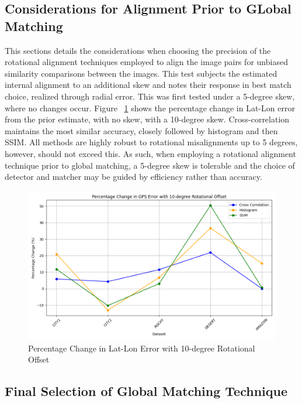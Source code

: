 \subsection{Considerations for Alignment Prior to GLobal Matching}

This sections details the considerations when choosing the precision of the rotational alignment techniques employed to align the image pairs for unbiased similarity comparisons  between the images. This test subjects the estimated internal alignment to an additional skew and notes their response in best match choice, realized through radial error. This was first tested under a 5-degree skew, where no changes occur. Figure ~\ref{fig:percentage_change_comparison_methods} shows the percentage change in Lat-Lon error from the prior estimate, with no skew, with a 10-degree skew. Cross-correlation maintains the most similar accuracy, closely followed by histogram and then SSIM. All methods are highly robust to rotational misalignments up to 5 degrees, however, should not exceed this. As such, when employing a rotational alignment technique prior to global matching, a 5-degree skew is tolerable and the choice of detector and matcher may be guided by efficiency rather than accuracy.


\begin{figure}[H]
    \centering
    \includegraphics[width=\textwidth]{./Chapter 4/testresults/percentage_change_comparison_methods.png}
    \caption{Percentage Change in Lat-Lon Error with 10-degree Rotational Offset}
    \label{fig:percentage_change_comparison_methods}
\end{figure}





\subsection{Final Selection of Global Matching Technique}

